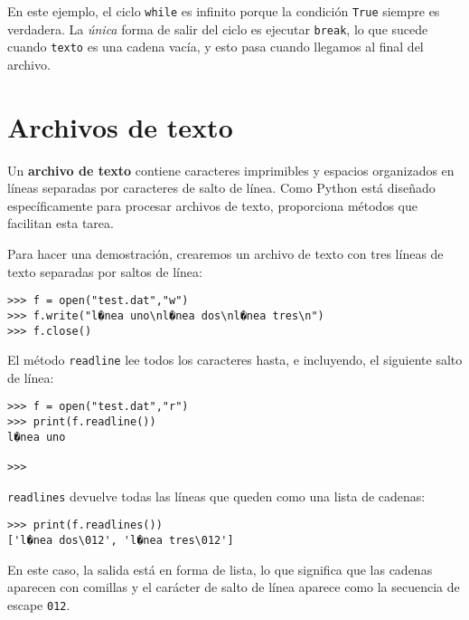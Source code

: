  

En este ejemplo, el ciclo \texttt{while} es infinito porque la condición
\texttt{True} siempre es verdadera. La {\em única} forma de salir
del ciclo es ejecutar \texttt{break}, lo que sucede cuando \texttt{texto}
es una cadena vacía, y esto pasa cuando llegamos al final del archivo.

\section{Archivos de texto}

 

Un \textbf{archivo de texto} contiene caracteres imprimibles y espacios
organizados en líneas separadas por caracteres de salto de línea.
Como Python está diseñado específicamente para procesar archivos de
texto, proporciona métodos que facilitan esta tarea.

Para hacer una demostración, crearemos un archivo de texto con tres
líneas de texto separadas por saltos de línea:
\begin{lstlisting}
>>> f = open("test.dat","w")
>>> f.write("l�nea uno\nl�nea dos\nl�nea tres\n")
>>> f.close()
\end{lstlisting}
El método \texttt{readline} lee todos los caracteres hasta, e incluyendo,
el siguiente salto de línea:
\begin{lstlisting}
>>> f = open("test.dat","r")
>>> print(f.readline())
l�nea uno

>>>
\end{lstlisting}
\texttt{readlines} devuelve todas las líneas que queden como una lista
de cadenas:
\begin{lstlisting}
>>> print(f.readlines())
['l�nea dos\012', 'l�nea tres\012']
\end{lstlisting}
En este caso, la salida está en forma de lista, lo que significa que
las cadenas aparecen con comillas y el carácter de salto de línea
aparece como la secuencia de escape \texttt{012}.

